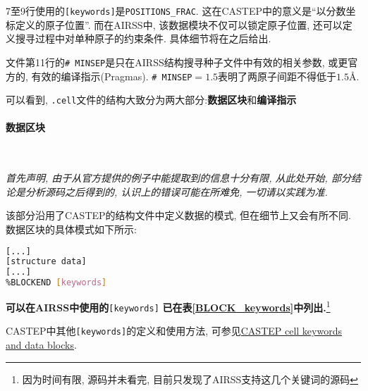 \documentclass[a4paper, 10pt]{article}
\begin{document}
      7至9行使用的\verb|[keywords]|是\verb|POSITIONS_FRAC|. 这在CASTEP中的意义是``以分数坐标定义的原子位置''. 而在AIRSS中, 该数据模块不仅可以锁定原子位置, 还可以定义搜寻过程中对单种原子的约束条件. 具体细节将在之后给出. 

      文件第11行的\verb|# MINSEP|是只在AIRSS结构搜寻种子文件中有效的相关参数, 或更官方的, 有效的编译指示(Pragmas).
      \verb|# MINSEP|\(=1.5\)表明了两原子间距不得低于\(1.5\)\r{A}.

      可以看到, \verb|.cell|文件的结构大致分为两大部分:\textbf{数据区块}和\textbf{编译指示}

      \paragraph{数据区块}\ 

        \emph{首先声明, 由于从官方提供的例子中能提取到的信息十分有限, 从此处开始, 部分结论是分析源码之后得到的, 认识上的错误可能在所难免, 一切请以实践为准.}

        该部分沿用了CASTEP的结构文件中定义数据的模式, 但在细节上又会有所不同.
        数据区块的具体模式如下所示:
        \begin{lstlisting}[language={bash}]
%BLOCK [keywords]
[...]
[structure data]
[...]
%BLOCKEND [keywords]
        \end{lstlisting}

        \textbf{可以在AIRSS中使用的}\verb|[keywords]| \textbf{已在表\ref{BLOCK_keywords}中列出.}\footnote{因为时间有限, 源码并未看完, 目前只发现了AIRSS支持这几个关键词的源码}

        CASTEP中其他\verb|[keywords]|的定义和使用方法, 可参见\href{http://www.tcm.phy.cam.ac.uk/castep/documentation/WebHelp/content/modules/castep/keywords/k_main_structure.htm}{CASTEP cell keywords and data blocks}.
      
\end{document}
